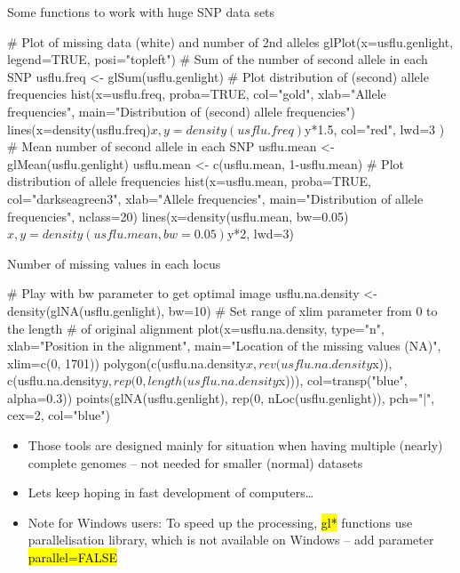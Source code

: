 \documentclass[compress, ucs, xelatex, 11pt, xcolor=svgnames,
  hyperref={
    bookmarks=true,
    unicode=true,
    colorlinks=true,
    pdftitle={Molecular data in R},
    plainpages=false,
    pdfauthor={Vojtech Zeisek},
    pdfsubject={Course about phylogeny and evolution in R},
    pdfcreator={XeLaTeX},
    pdfkeywords={R, evolution, phylogeny, molecular data},
    linkcolor=Tomato,
    anchorcolor=SaddleBrown,
    citecolor=Goldenrod,
    filecolor=DarkMagenta,
    menucolor=Sienna,
    urlcolor=DarkTurquoise,
    pdftex},
  url={hyphens, lowtilde} %
  ]{beamer}
\renewcommand{\texttt}[1]{\hl{\ttfamily #1}}
\begin{document}
\begin{frame}[fragile]{Some functions to work with huge SNP data sets}
  \begin{spluscode}
    # Plot of missing data (white) and number of 2nd alleles
    glPlot(x=usflu.genlight, legend=TRUE, posi="topleft")
    # Sum of the number of second allele in each SNP
    usflu.freq <- glSum(usflu.genlight)
    # Plot distribution of (second) allele frequencies
    hist(x=usflu.freq, proba=TRUE, col="gold", xlab="Allele
      frequencies", main="Distribution of (second) allele frequencies")
    lines(x=density(usflu.freq)$x, y=density(usflu.freq)$y*1.5,
      col="red", lwd=3 )
    # Mean number of second allele in each SNP
    usflu.mean <- glMean(usflu.genlight)
    usflu.mean <- c(usflu.mean, 1-usflu.mean)
    # Plot distribution of allele frequencies
    hist(x=usflu.mean, proba=TRUE, col="darkseagreen3",
      xlab="Allele frequencies", main="Distribution of allele
      frequencies", nclass=20)
    lines(x=density(usflu.mean, bw=0.05)$x, y=density(usflu.mean,
      bw=0.05)$y*2, lwd=3)
  \end{spluscode}
\end{frame}

\begin{frame}[fragile]{Number of missing values in each locus}
  \begin{spluscode}
    # Play with bw parameter to get optimal image
    usflu.na.density <- density(glNA(usflu.genlight), bw=10)
    # Set range of xlim parameter from 0 to the length
    # of original alignment
    plot(x=usflu.na.density, type="n", xlab="Position in the alignment",
      main="Location of the missing values (NA)", xlim=c(0, 1701))
    polygon(c(usflu.na.density$x, rev(usflu.na.density$x)),
      c(usflu.na.density$y, rep(0, length(usflu.na.density$x))),
      col=transp("blue", alpha=0.3))
    points(glNA(usflu.genlight), rep(0, nLoc(usflu.genlight)), 
      pch="|", cex=2, col="blue")
  \end{spluscode}
  \begin{itemize}
    \item Those tools are designed mainly for situation when having multiple (nearly) complete genomes -- not needed for smaller (normal) datasets
    \item Lets keep hoping in fast development of computers\ldots
    \item \alert{Note for Windows users:} To speed up the processing, \texttt{gl*} functions use parallelisation library, which is not available on Windows -- add parameter \texttt{parallel=FALSE}
  \end{itemize}
\end{frame}
\end{document}

